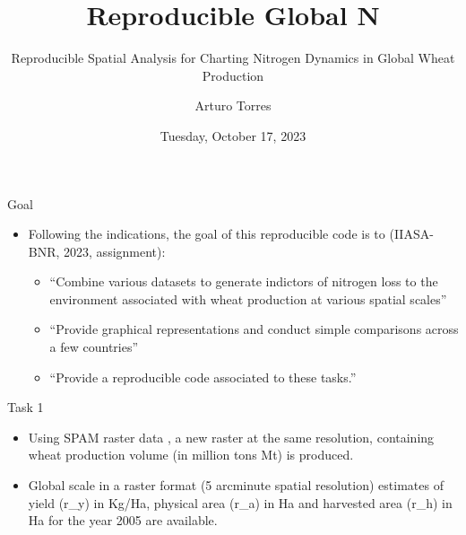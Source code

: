 \documentclass[
  ignorenonframetext,
  aspectratio=169,
]{beamer}
\title{Reproducible Global N}
\subtitle{Reproducible Spatial Analysis for Charting Nitrogen Dynamics
in Global Wheat Production}
\author{Arturo Torres}
\date{Tuesday, October 17, 2023}
\begin{document}
\frame{\titlepage}
\ifdefined\Shaded\renewenvironment{Shaded}{\begin{tcolorbox}[interior hidden, borderline west={3pt}{0pt}{shadecolor}, enhanced, breakable, sharp corners, frame hidden, boxrule=0pt]}{\end{tcolorbox}}\fi

\begin{frame}{Goal}
\protect\hypertarget{goal}{}
\begin{itemize}[<+->]
\item
  Following the indications, the goal of this reproducible code is to
  (IIASA-BNR, 2023, assignment):

  \begin{itemize}[<+->]
  \item
    ``Combine various datasets to generate indictors of nitrogen loss to
    the environment associated with wheat production at various spatial
    scales''
  \item
    ``Provide graphical representations and conduct simple comparisons
    across a few countries''
  \item
    ``Provide a reproducible code associated to these tasks.''
  \end{itemize}
\end{itemize}
\end{frame}

\begin{frame}{Task 1}
\protect\hypertarget{task-1}{}
\begin{itemize}[<+->]
\item
  Using SPAM raster data \citep{wood-sichra_spatial_2016}, a new raster
  at the same resolution, containing wheat production volume (in million
  tons Mt) is produced.
\item
  Global scale in a raster format (5 arcminute spatial resolution)
  estimates of yield (r\_y) in Kg/Ha, physical area (r\_a) in Ha and
  harvested area (r\_h) in Ha for the year 2005 are available.
\end{itemize}

\linespread{0.5}

\linespread{2}
\end{frame}
\end{document}
